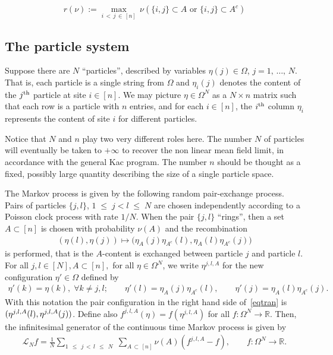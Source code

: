 \documentclass[10pt,a4paper]{article}
\renewcommand{\leq}{\;\leqslant\;}
\newcommand{\cL}{\mathcal{L}}
\newcommand{\bbR}{\mathbb{R}}
\let\O=\Omega
\let\oldforall\forall
\renewcommand*{\forall}{\mathrel{\oldforall}}
\begin{document}
\begin{equation}\label{def:rnu}
r(\nu):= \max_{i\,<\,j\,\in\,[n]}\,\nu\left(\{i,j\}\subset A \text{ or }\{i,j\}\subset A^c\right)
\end{equation}

\subsection{The particle system}

Suppose there are $N$ ``particles'', described by variables $\eta(j)\in\O$, $j=1,\,\dots,\,N$. That is, each particle is a single string from $\O$ and $\eta_i(j)$ denotes the content of the $j^{\rm th}$ particle at site $i\in[n]$. We may picture $\eta\in\O^N$ as a $N\times n$ matrix such that each row is a particle with $n$ entries, and for each $i\in[n]$, the $i^{\rm th}$ column $\eta_i$ represents the content of site $i$ for different particles.

Notice that $N$ and $n$ play two very different roles here. The number $N$ of particles will eventually be taken to $+\infty$ to recover the non linear mean field limit, in accordance with the general Kac program. The number $n$ should be thought as a fixed, possibly large quantity describing the size of a single particle space.

The Markov process is given by the following random pair-exchange process. Pairs of particles $\{j,l\}$, $1\leq j<l\leq N$ are chosen independently according to a Poisson clock process with rate $1/N$. When the pair $\{j,l\}$ ``rings'', then a set $A\subset[n]$ is chosen with probability $\nu(A)$ and the recombination
\begin{align}\label{eqtran}
(\eta(l),\eta(j)) \mapsto \big(\eta_A(j)\eta_{A^c}(l),\eta_A(l)\eta_{A^c}(j)\big)
\end{align}
is performed, that is the $A$-content is exchanged between particle $j$ and particle $l$. For all $j,l \in [N], A \subset [n],$ for all $\eta \in \Omega^N$, we write $\eta^{j,l,A}$ for the new configuration $\eta' \in \Omega$ defined by
\begin{align}\label{def:etajl}
\eta'(k)=\eta(k), \;\forall k \neq j,l;\qquad \eta'(l)=\eta_{A}(j)\eta_{A^c}(l),\qquad \eta'(j)=\eta_A(l)\eta_{A^c}(j).
\end{align}
With this notation the pair configuration in the right hand side of~\eqref{eqtran} is $(\eta^{j,l,A}(l),\linebreak\eta^{j,l,A}(j))$. Define also $f^{j,l,A}(\eta)=f(\eta^{j,l,A})$ for all $f:\Omega^N \rightarrow \bbR$. Then, the infinitesimal generator of the continuous time Markov process is given by
\begin{align}\label{operator}
\cL_N f = \frac{1}{N}\sum_{1\,\leq\,j\,<\,l\,\leq\,N}\;\sum_{A\,\subset\,[n]}\nu(A)\left(f^{j,l,A}-f\right), \qquad f:\Omega^N \rightarrow \bbR.
\end{align}
\end{document}
